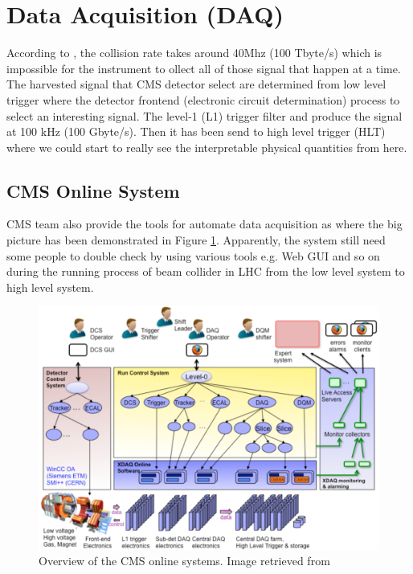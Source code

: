 \section{Data Acquisition (DAQ)}


According to \cite{cms_tridas_2002}, the collision rate takes around 40Mhz (100 Tbyte/s) which is impossible for the instrument to ollect all of those signal that happen at a time.
The harvested signal that CMS detector select are determined from low level trigger where the detector frontend (electronic circuit determination) process to select an interesting signal.
The level-1 (L1) trigger filter and produce the signal at 100 kHz (100 Gbyte/s). Then it has been send to high level trigger (HLT) where we could start to really see the interpretable physical quantities from here.

\subsection{CMS Online System}

CMS team also provide the tools for automate data acquisition as \cite{cms_daq} where the big picture has been demonstrated in Figure \ref{fig:cms_online_system}.
Apparently, the system still need some people to double check by using various tools e.g. Web GUI and so on during the running process of beam collider in LHC from the low level system to high level system.
\begin{figure}[h!]
    \centering
    \includegraphics[width=\textwidth]{images/cms_online_system.png}
    \caption{Overview of the CMS online systems. Image retrieved from \cite{cms_daq}}
    \label{fig:cms_online_system}
\end{figure}


